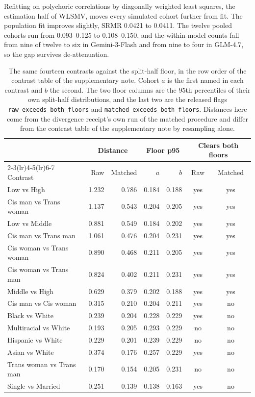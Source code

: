 \documentclass[wcp]{jmlr}
\begin{document}
Refitting on polychoric correlations by diagonally weighted least squares, the estimation half of WLSMV, moves every simulated cohort further from fit. The population fit improves slightly, SRMR 0.0421 to 0.0411. The twelve pooled cohorts run from 0.093--0.125 to 0.108--0.150, and the within-model counts fall from nine of twelve to six in Gemini-3-Flash and from nine to four in GLM-4.7, so the gap survives de-attenuation.

\begin{table}[!htb]
\centering
\caption{The same fourteen contrasts against the split-half floor, in the row order of the contrast table of the supplementary note. Cohort $a$ is the first named in each contrast and $b$ the second. The two floor columns are the 95th percentiles of their own split-half distributions, and the last two are the released flags \texttt{raw\_exceeds\_both\_floors} and
\texttt{matched\_exceeds\_both\_floors}. Distances here come from the divergence receipt's own run of
the matched procedure and differ from the contrast table of the supplementary note by resampling alone.}
\label{tab:floors}
\scriptsize
\renewcommand{\arraystretch}{0.92}
\setlength{\tabcolsep}{5pt}
\begin{tabular}{lrrrrcc}
\toprule
 & \multicolumn{2}{c}{Distance} & \multicolumn{2}{c}{Floor p95} & \multicolumn{2}{c}{Clears both floors} \\
\cmidrule(lr){2-3}\cmidrule(lr){4-5}\cmidrule(lr){6-7}
Contrast & Raw & Matched & $a$ & $b$ & Raw & Matched \\
\midrule
Low vs High & 1.232 & 0.786 & 0.184 & 0.188 & yes & yes \\
Cis man vs Trans woman & 1.137 & 0.543 & 0.204 & 0.205 & yes & yes \\
Low vs Middle & 0.881 & 0.549 & 0.184 & 0.202 & yes & yes \\
Cis man vs Trans man & 1.061 & 0.476 & 0.204 & 0.231 & yes & yes \\
Cis woman vs Trans woman & 0.890 & 0.468 & 0.211 & 0.205 & yes & yes \\
Cis woman vs Trans man & 0.824 & 0.402 & 0.211 & 0.231 & yes & yes \\
Middle vs High & 0.629 & 0.379 & 0.202 & 0.188 & yes & yes \\
Cis man vs Cis woman & 0.315 & 0.210 & 0.204 & 0.211 & yes & no \\
Black vs White & 0.239 & 0.204 & 0.228 & 0.229 & yes & no \\
Multiracial vs White & 0.193 & 0.205 & 0.293 & 0.229 & no & no \\
Hispanic vs White & 0.229 & 0.201 & 0.239 & 0.229 & no & no \\
Asian vs White & 0.374 & 0.176 & 0.257 & 0.229 & yes & no \\
Trans woman vs Trans man & 0.170 & 0.154 & 0.205 & 0.231 & no & no \\
Single vs Married & 0.251 & 0.139 & 0.138 & 0.163 & yes & no \\
\bottomrule
\end{tabular}
\end{table}
\end{document}
